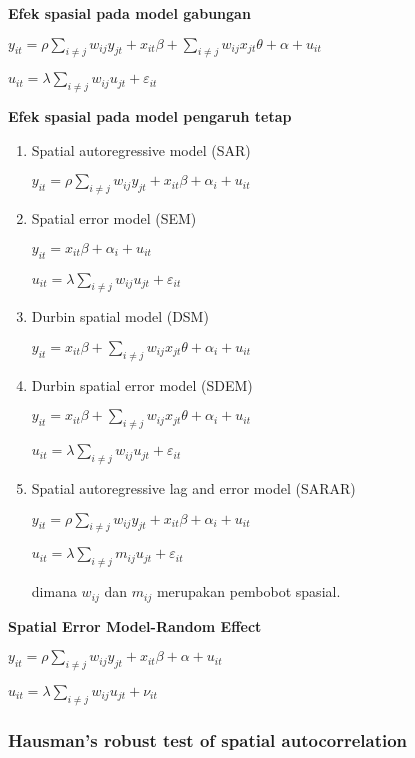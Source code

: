 \documentclass[
]{book}
\begin{document}
\textbf{Efek spasial pada model gabungan}

\(y_{it}=\rho\sum_{i \ne j} w_{ij} y_{jt} + x_{it}\beta + \sum_{i \ne j} w_{ij} x_{jt} \theta + \alpha + u_{it}\)

\(u_{it}=\lambda \sum_{i \ne j} w_{ij} u_{jt} + \varepsilon_{it}\)

\textbf{Efek spasial pada model pengaruh tetap}

\begin{enumerate}
\def\labelenumi{(\arabic{enumi})}
\item
  Spatial autoregressive model (SAR)

  \(y_{it}=\rho\sum_{i \ne j} w_{ij} y_{jt} + x_{it}\beta + \alpha_i + u_{it}\)
\item
  Spatial error model (SEM)

  \(y_{it}= x_{it}\beta + \alpha_i + u_{it}\)

  \(u_{it}=\lambda \sum_{i \ne j} w_{ij} u_{jt} + \varepsilon_{it}\)
\item
  Durbin spatial model (DSM)

  \(y_{it}=x_{it}\beta + \sum_{i \ne j} w_{ij} x_{jt} \theta + \alpha_i + u_{it}\)
\item
  Durbin spatial error model (SDEM)

  \(y_{it}= x_{it}\beta + \sum_{i \ne j} w_{ij} x_{jt} \theta + \alpha_i + u_{it}\)

  \(u_{it}=\lambda \sum_{i \ne j} w_{ij} u_{jt} + \varepsilon_{it}\)
\item
  Spatial autoregressive lag and error model (SARAR)

  \(y_{it}=\rho\sum_{i \ne j} w_{ij} y_{jt} + x_{it}\beta + \alpha_i + u_{it}\)

  \(u_{it}=\lambda \sum_{i \ne j} m_{ij} u_{jt} + \varepsilon_{it}\)

  dimana \(w_{ij}\) dan \(m_{ij}\) merupakan pembobot spasial.
\end{enumerate}

\textbf{Spatial Error Model-Random Effect}

\(y_{it}=\rho\sum_{i \ne j} w_{ij} y_{jt} + x_{it}\beta + \alpha + u_{it}\)

\(u_{it}=\lambda \sum_{i \ne j} w_{ij} u_{jt} + \nu_{it}\)

\hypertarget{hausmans-robust-test-of-spatial-autocorrelation}{%
\subsubsection{Hausman's robust test of spatial autocorrelation}\label{hausmans-robust-test-of-spatial-autocorrelation}}
\end{document}
